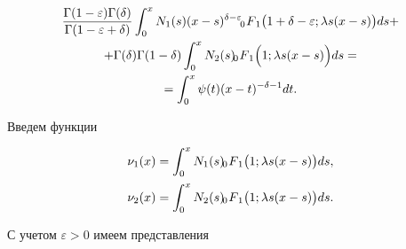 \begin{multline}

\frac{\Gamma(1-\varepsilon) \Gamma(\delta)}{\Gamma(1-\varepsilon+\delta)} \int _0^x N_1(s) (x-s)^{\delta-\varepsilon} \,\,

F_{\hspace{-4mm}0 \hspace{3mm}1} \bigl(1+\delta-\varepsilon;\lambda s (x-s)\bigr) ds +

\\

\label{dolg:eq10}

+ \Gamma(\delta) \Gamma(1-\delta) \int _0^x N_2(s) \,\,

F_{\hspace{-4mm}0 \hspace{3mm}1} \Bigl(1;\lambda s (x-s)\Bigr) ds = \\ = \int _0^x \psi(t) (x-t)^{-\delta-1} dt.

\end{multline}

Введем функции

\begin{equation}\label{dolg:eq11}

\begin{array}{l}

\displaystyle 

\nu_1(x) = \int _0^x N_1(s)  \,\,

F_{\hspace{-4mm}0 \hspace{3mm}1} \bigl(1;\lambda s (x-s)\bigr) ds, \\[4mm]

\displaystyle 

\nu_2(x) = \int _0^x N_2(s)  \,\,

F_{\hspace{-4mm}0 \hspace{3mm}1} \bigl(1;\lambda s (x-s)\bigr) ds.

\end{array}

\end{equation}



С учетом  $\varepsilon>0$ имеем представления


